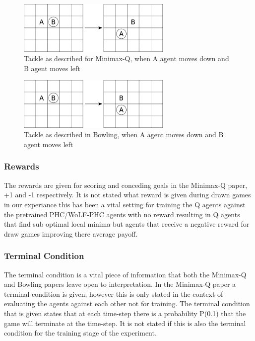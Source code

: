 \documentclass{article}
\begin{document}
\begin{figure}
    \centering
    \includegraphics[width=20em]{./Figures/minimax-tackle.png}
    \caption{Tackle as described for Minimax-Q, when A agent moves down and B agent moves left}
    \label{fig:minimax-tackle}
\end{figure}

\begin{figure}
    \centering
    \includegraphics[width=20em]{./Figures/bowling-tackle.png}
    \caption{Tackle as described in Bowling, when A agent moves down and B agent moves left}
    \label{fig:bowling-tackle}
\end{figure}

\subsubsection*{Rewards}

The rewards are given for scoring and conceding goals in the Minimax-Q paper, +1 and -1 respectively. It is not stated what reward is given during drawn games in our experiance this has been a vital setting for training the Q agents against the pretrained PHC/WoLF-PHC agents with no reward resulting in Q agents that find sub optimal local minima but agents that receive a negative reward for draw games improving there average payoff.

\subsubsection*{Terminal Condition}
The terminal condition is a vital piece of information that both the Minimax-Q and Bowling papers leave open to interpretation. In the Minimax-Q paper a terminal condition is given, however this is only stated in the context of evaluating the agents against each other not for training. The terminal condition that is given states that at each time-step there is a probability P(0.1) that the game will terminate at the time-step. It is not stated if this is also the terminal condition for the training stage of the experiment.
\end{document}
